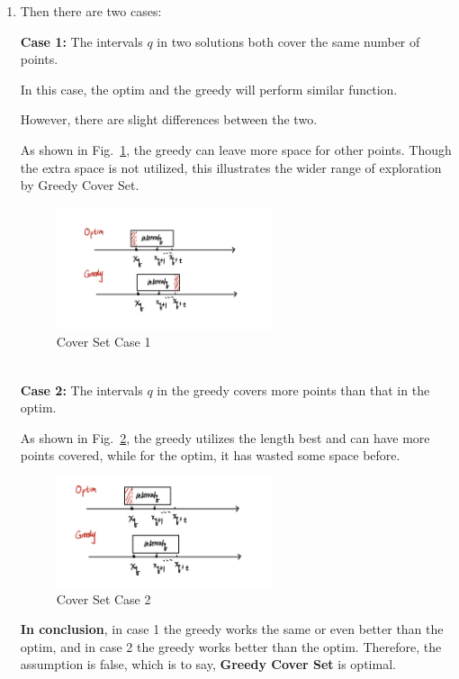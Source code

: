 \documentclass[12pt,a4paper]{article}
\makeatletter
\newtheorem*{solution}{Solution}
\theoremstyle{definition}
\renewenvironment{solution}[1][Solution] {\par\pushQED{\qed}\normalfont\topsep6\p@\@plus6\p@\relax\trivlist\item[\hskip\labelsep\bfseries#1\@addpunct{.}]\ignorespaces}{\popQED\endtrivlist\@endpefalse} \makeatother
\makeatother
\begin{document}
\begin{enumerate}
\begin{solution}
\begin{enumerate}
Then there are two cases:

\textbf{Case 1:} The intervals $q$ in two solutions both cover the same number of points. 

In this case, the optim and the greedy will perform similar function.

However, there are slight differences between the two. 

As shown in Fig.~\ref{explain4}, the greedy can leave more space for other points. Though the extra space is not utilized, this illustrates the wider range of exploration by Greedy Cover Set.

\begin{figure}[htbp]
    \centering
    \includegraphics[width=0.6\textwidth]{explain4.jpg}
    \caption{Cover Set Case 1}\label{explain4}
\end{figure}

~\\
\textbf{Case 2:} The intervals $q$ in the greedy covers more points than that in the optim.

As shown in Fig.~\ref{explain3}, the greedy utilizes the length best and can have more points covered, while for the optim, it has wasted some space before.

\begin{figure}[htbp]
    \centering
    \includegraphics[width=0.6\textwidth]{explain3.jpg}
    \caption{Cover Set Case 2}\label{explain3}
\end{figure}


\textbf{In conclusion}, in case 1 the greedy works the same or even better than the optim, and in case 2 the greedy works better than the optim. Therefore, the assumption is false, which is to say, \textbf{Greedy Cover Set} is optimal.




\end{enumerate}
\end{solution}
\end{enumerate}
\end{document}
